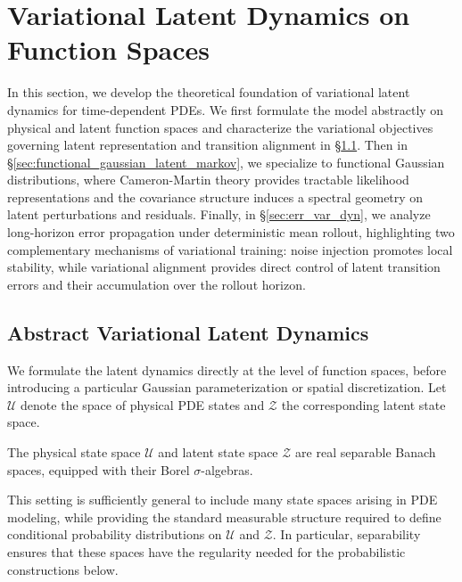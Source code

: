 \documentclass[11pt]{article}
\begin{document}
\section{Variational Latent Dynamics on Function Spaces}\label{sec:var_latent_dyn}
In this section, we develop the theoretical foundation of variational latent dynamics for time-dependent PDEs. We first formulate the model abstractly on physical and latent function spaces and characterize the variational objectives governing latent representation and transition alignment in \S\ref{sec:abstract_vld}. Then in \S\ref{sec:functional_gaussian_latent_markov}, we specialize to functional Gaussian distributions, where Cameron-Martin theory provides tractable likelihood representations and the covariance structure induces a spectral geometry on latent perturbations and residuals. Finally, in \S\ref{sec:err_var_dyn}, we analyze long-horizon error propagation under deterministic mean rollout, highlighting two complementary mechanisms of variational training: noise injection promotes local stability, while variational alignment provides direct control of latent transition errors and their accumulation over the rollout horizon.

\subsection{Abstract Variational Latent Dynamics}\label{sec:abstract_vld}
We formulate the latent dynamics directly at the level of function spaces, before introducing a particular Gaussian parameterization or spatial discretization. Let $\mathcal U$ denote the space of physical PDE states and $\mathcal Z$ the corresponding latent state space.
\begin{assumption}
\label{assump:state_spaces}
The physical state space $\mathcal U$ and latent state space $\mathcal Z$ are real separable Banach spaces, equipped with their Borel $\sigma$-algebras.
\end{assumption}
This setting is sufficiently general to include many state spaces arising in PDE modeling, while providing the standard measurable structure required to define conditional probability distributions on $\mathcal U$ and $\mathcal Z$. In particular, separability ensures that these spaces have the regularity needed for the probabilistic constructions below.
\end{document}
